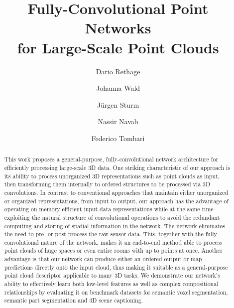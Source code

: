 \documentclass[runningheads]{llncs}
\begin{document}
\title{Fully-Convolutional Point Networks\\for Large-Scale Point Clouds} 


\author{Dario Rethage \and
Johanna Wald \and
J\"urgen Sturm \and \break
Nassir Navab \and
Federico Tombari}


\maketitle              \begin{abstract}
This work proposes a general-purpose, fully-convolutional network architecture for efficiently processing large-scale 3D data. One striking characteristic of our approach is its ability to process unorganized 3D representations such as point clouds as input, then transforming them internally to ordered structures to be processed via 3D convolutions. In contrast to conventional approaches that maintain either unorganized or organized representations, from input to output, our approach has the advantage of operating on memory efficient input data representations while at the same time exploiting the natural structure of convolutional operations to avoid the redundant computing and storing of spatial information in the network. The network eliminates the need to pre- or post process the raw sensor data. This, together with the fully-convolutional nature of the network, makes it an end-to-end method able to process point clouds of huge spaces or even entire rooms with up to  points at once. Another advantage is that our network can produce either an ordered output or map predictions directly onto the input cloud, thus making it suitable as a general-purpose point cloud descriptor applicable to many 3D tasks. We demonstrate our network's ability to effectively learn both low-level features as well as complex compositional relationships by evaluating it on benchmark datasets for semantic voxel segmentation, semantic part segmentation and 3D scene captioning.

\end{abstract}
\end{document}
